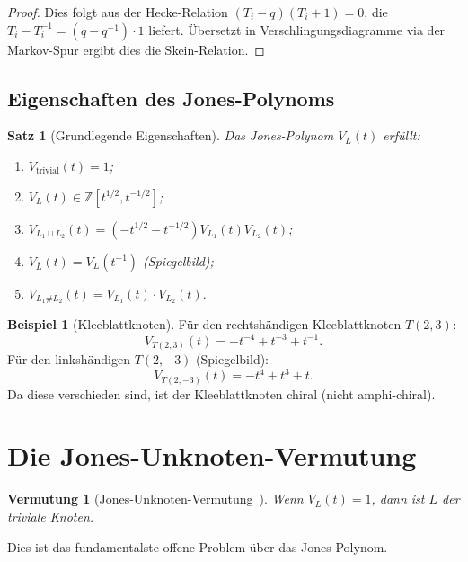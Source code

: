 \documentclass[12pt,a4paper]{amsart}
\newtheorem{satz}[theorem]{Satz}
\newtheorem{vermutung}[theorem]{Vermutung}
\theoremstyle{definition}
\newtheorem{beispiel}[theorem]{Beispiel}
\theoremstyle{remark}
\newcommand{\Z}{\mathbb{Z}}
\begin{document}
\begin{proof}
Dies folgt aus der Hecke-Relation $(T_i - q)(T_i + 1) = 0$, die
$T_i - T_i^{-1} = (q - q^{-1}) \cdot 1$ liefert. Übersetzt in
Verschlingungsdiagramme via der Markov-Spur ergibt dies die Skein-Relation.
\end{proof}

\subsection{Eigenschaften des Jones-Polynoms}

\begin{satz}[Grundlegende Eigenschaften]
Das Jones-Polynom $V_L(t)$ erfüllt:
\begin{enumerate}[label=\roman*)]
\item $V_{\text{trivial}}(t) = 1$;
\item $V_L(t) \in \Z[t^{1/2}, t^{-1/2}]$;
\item $V_{L_1 \sqcup L_2}(t) = (-t^{1/2} - t^{-1/2}) V_{L_1}(t) V_{L_2}(t)$;
\item $V_{\bar{L}}(t) = V_L(t^{-1})$ (Spiegelbild);
\item $V_{L_1 \# L_2}(t) = V_{L_1}(t) \cdot V_{L_2}(t)$.
\end{enumerate}
\end{satz}

\begin{beispiel}[Kleeblattknoten]
Für den rechtshändigen Kleeblattknoten $T(2,3)$:
\[
    V_{T(2,3)}(t) = -t^{-4} + t^{-3} + t^{-1}.
\]
Für den linkshändigen $T(2,-3)$ (Spiegelbild):
\[
    V_{T(2,-3)}(t) = -t^{4} + t^{3} + t.
\]
Da diese verschieden sind, ist der Kleeblattknoten chiral (nicht amphi-chiral).
\end{beispiel}

\section{Die Jones-Unknoten-Vermutung}

\begin{vermutung}[Jones-Unknoten-Vermutung~\cite{Jones1985}]
\label{verm:Jones}
Wenn $V_L(t) = 1$, dann ist $L$ der triviale Knoten.
\end{vermutung}

Dies ist das fundamentalste offene Problem über das Jones-Polynom.
\end{document}
